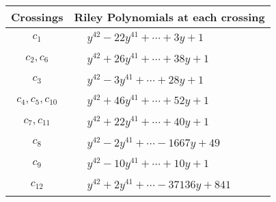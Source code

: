 \documentclass[1p]{elsarticle_modified}
\theoremstyle{definition}
\begin{document}
\begin{tabular}{m{50pt}|m{274pt}}
Crossings & \hspace{64pt}Riley Polynomials at each crossing \\
\hline $$\begin{aligned}c_{1}\end{aligned}$$&$\begin{aligned}
&y^{42}-22 y^{41}+\cdots+3 y+1
\end{aligned}$\\
\hline $$\begin{aligned}c_{2},c_{6}\end{aligned}$$&$\begin{aligned}
&y^{42}+26 y^{41}+\cdots+38 y+1
\end{aligned}$\\
\hline $$\begin{aligned}c_{3}\end{aligned}$$&$\begin{aligned}
&y^{42}-3 y^{41}+\cdots+28 y+1
\end{aligned}$\\
\hline $$\begin{aligned}c_{4},c_{5},c_{10}\end{aligned}$$&$\begin{aligned}
&y^{42}+46 y^{41}+\cdots+52 y+1
\end{aligned}$\\
\hline $$\begin{aligned}c_{7},c_{11}\end{aligned}$$&$\begin{aligned}
&y^{42}+22 y^{41}+\cdots+40 y+1
\end{aligned}$\\
\hline $$\begin{aligned}c_{8}\end{aligned}$$&$\begin{aligned}
&y^{42}-2 y^{41}+\cdots-1667 y+49
\end{aligned}$\\
\hline $$\begin{aligned}c_{9}\end{aligned}$$&$\begin{aligned}
&y^{42}-10 y^{41}+\cdots+10 y+1
\end{aligned}$\\
\hline $$\begin{aligned}c_{12}\end{aligned}$$&$\begin{aligned}
&y^{42}+2 y^{41}+\cdots-37136 y+841
\end{aligned}$\\
\hline
\end{tabular}\\~\\
\end{document}
